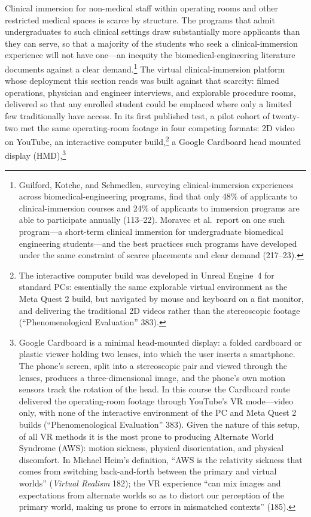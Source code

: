 Clinical immersion for non-medical staff within operating rooms and other
restricted medical spaces is scarce by structure. The programs that admit
undergraduates to such clinical settings draw substantially more applicants than
they can serve, so that a majority of the students who seek a clinical-immersion
experience will not have one---an inequity the biomedical-engineering literature
documents against a clear demand.\footnote{Guilford, Kotche, and Schmedlen,
surveying clinical-immersion experiences across biomedical-engineering programs,
find that only 48\% of applicants to clinical-immersion courses and 24\% of
applicants to immersion programs are able to participate annually (113--22).
Moravec et al.\ report on one such program---a short-term clinical immersion for
undergraduate biomedical engineering students---and the best practices such
programs have developed under the same constraint of scarce placements and clear
demand (217--23).} The virtual clinical-immersion platform whose deployment this
section reads was built against that scarcity: filmed operations, physician and
engineer interviews, and explorable procedure rooms, delivered so that any
enrolled student could be emplaced where only a limited few traditionally have
access. In its first published test, a pilot cohort of twenty-two
met the same operating-room footage in four competing formats: 2D video on
YouTube, an interactive computer build,\footnote{The interactive computer build
was developed in Unreal Engine~4 for standard PCs: essentially the same
explorable virtual environment as the Meta Quest 2 build, but navigated by mouse
and keyboard on a flat monitor, and delivering the traditional 2D videos rather
than the stereoscopic footage (``Phenomenological Evaluation'' 383).} a Google
Cardboard head mounted display (HMD),\footnote{Google Cardboard is a minimal
head-mounted display: a folded cardboard or plastic viewer holding two lenses,
into which the user inserts a smartphone. The phone's screen, split into a
stereoscopic pair and viewed through the lenses, produces a three-dimensional
image, and the phone's own motion sensors track the rotation of the head. In
this course the Cardboard route delivered the operating-room footage through
YouTube's VR mode---video only, with none of the interactive environment of the
PC and Meta Quest 2 builds (``Phenomenological Evaluation'' 383). Given the
nature of this setup, of all VR methods it is the most prone to producing
Alternate World Syndrome (AWS): motion sickness, physical disorientation, and
physical discomfort. In Michael Heim's definition, ``AWS is the relativity
sickness that comes from switching back-and-forth between the primary and
virtual worlds'' (\textit{Virtual Realism} 182); the VR experience ``can mix
images and expectations from alternate worlds so as to distort our perception of
the primary world, making us prone to errors in mismatched contexts'' (185).}
